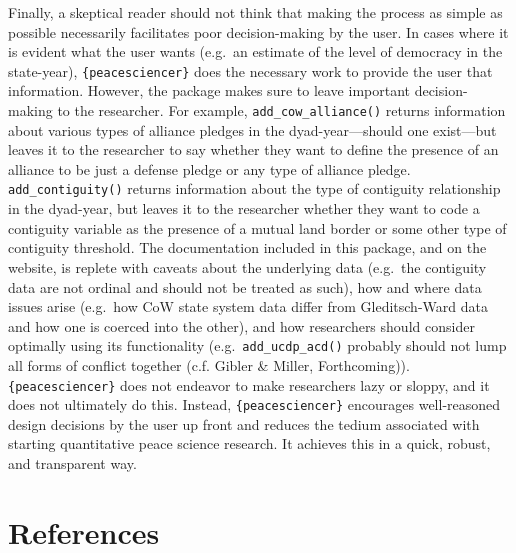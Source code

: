 \documentclass[
  11pt,
]{article}
\begin{document}
Finally, a skeptical reader should not think that making the process as simple as possible necessarily facilitates poor decision-making by the user. In cases where it is evident what the user wants (e.g.~an estimate of the level of democracy in the state-year), \texttt{\{peacesciencer\}} does the necessary work to provide the user that information. However, the package makes sure to leave important decision-making to the researcher. For example, \texttt{add\_cow\_alliance()} returns information about various types of alliance pledges in the dyad-year---should one exist---but leaves it to the researcher to say whether they want to define the presence of an alliance to be just a defense pledge or any type of alliance pledge. \texttt{add\_contiguity()} returns information about the type of contiguity relationship in the dyad-year, but leaves it to the researcher whether they want to code a contiguity variable as the presence of a mutual land border or some other type of contiguity threshold. The documentation included in this package, and on the website, is replete with caveats about the underlying data (e.g.~the contiguity data are not ordinal and should not be treated as such), how and where data issues arise (e.g.~how CoW state system data differ from Gleditsch-Ward data and how one is coerced into the other), and how researchers should consider optimally using its functionality (e.g.~\texttt{add\_ucdp\_acd()} probably should not lump all forms of conflict together (c.f. Gibler \& Miller, Forthcoming)). \texttt{\{peacesciencer\}} does not endeavor to make researchers lazy or sloppy, and it does not ultimately do this. Instead, \texttt{\{peacesciencer\}} encourages well-reasoned design decisions by the user up front and reduces the tedium associated with starting quantitative peace science research. It achieves this in a quick, robust, and transparent way.

\newpage

\hypertarget{references}{%
\section{References}\label{references}}

\setlength{\parskip}{6pt}
\end{document}
